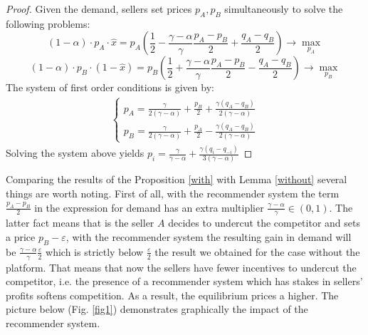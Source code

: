 \documentclass[a4paper]{article}
\begin{document}
\begin{proof}
	 
	 
	 
	 Given the demand, 	sellers set prices $p_A, p_B$ simultaneously to solve the following problems:
	 $$(1-\alpha)\cdot p_A \cdot \hat{x} = p_A \left(\frac{1}{2} - \frac{\gamma - \alpha}{\gamma} \frac{p_A - p_B}{2} + \frac{q_A - q_B}{2}\right) \to \underset{p_A}{\max}$$
	 $$(1-\alpha)\cdot p_B \cdot (1-\hat{x}) = p_B \left(\frac{1}{2} + \frac{\gamma - \alpha}{\gamma} \frac{p_A - p_B}{2} - \frac{q_A - q_B}{2}\right) \to \underset{p_B}{\max}$$
	 The system of first order conditions is given by:
	 \begin{align*}
	 \begin{cases}
	 p_A = \frac{\gamma}{2(\gamma - \alpha)} + \frac{p_B}{2} + \frac{\gamma(q_A - q_B)}{2(\gamma - \alpha)}\\
	 p_B = \frac{\gamma}{2(\gamma - \alpha)} + \frac{p_A}{2} - \frac{\gamma(q_A - q_B)}{2(\gamma - \alpha)}
	 \end{cases}
	 \end{align*}
	 Solving the system above yields $p_i = \frac{\gamma}{\gamma - \alpha} + \frac{\gamma(q_i - q_{-i})}{3(\gamma - \alpha)}$
	\end{proof}
Comparing the results of the Proposition \ref{with} with Lemma \ref{without} several things are worth noting. First of all, with the recommender system the term $\frac{p_A-p_B}{2}$ in the expression for demand has an extra multiplier $\frac{\gamma-\alpha}{\gamma} \in (0, 1)$. The latter fact means that is the seller $A$ decides to undercut the competitor and sets a price $p_B - \varepsilon$, with the recommender system the resulting gain in demand will be $\frac{\gamma - \alpha}{\gamma} \frac{\varepsilon}{2}$ which is strictly below $\frac{\varepsilon}{2}$ the result we obtained for the case without the platform. That means that now the sellers have fewer incentives to undercut the competitor, i.e. the presence of a recommender system which has stakes in sellers' profits softens competition. As a result, the equilibrium prices a higher. The picture below (Fig. \ref{fig1}) demonstrates graphically the impact of the recommender system. 
	
\end{document}
